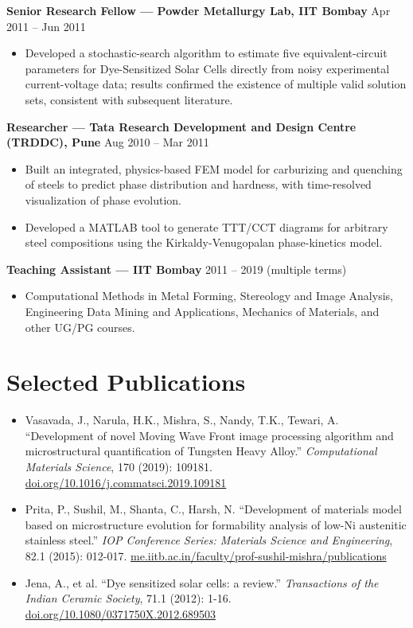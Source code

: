 \documentclass[10.5pt,a4paper]{article}
\newenvironment{tightitemize}
  {\begin{itemize}[leftmargin=1.2em,itemsep=1pt,topsep=2pt,parsep=0pt]}
  {\end{itemize}}
\newcommand{\entry}[3]{%
  \par\noindent\textbf{#1} \hfill #2\\
  {\itshape\small #3}\par\smallskip
}
\begin{document}
\entry{Senior Research Fellow --- Powder Metallurgy Lab, IIT Bombay}{Apr 2011 -- Jun 2011}{}
\begin{tightitemize}
\item Developed a stochastic-search algorithm to estimate five equivalent-circuit parameters for Dye-Sensitized Solar Cells directly from noisy experimental current-voltage data; results confirmed the existence of multiple valid solution sets, consistent with subsequent literature.
\end{tightitemize}

\entry{Researcher --- Tata Research Development and Design Centre (TRDDC), Pune}{Aug 2010 -- Mar 2011}{}
\begin{tightitemize}
\item Built an integrated, physics-based FEM model for carburizing and quenching of steels to predict phase distribution and hardness, with time-resolved visualization of phase evolution.
\item Developed a MATLAB tool to generate TTT/CCT diagrams for arbitrary steel compositions using the Kirkaldy-Venugopalan phase-kinetics model.
\end{tightitemize}

\entry{Teaching Assistant --- IIT Bombay}{2011 -- 2019 (multiple terms)}{}
\begin{tightitemize}
\item Computational Methods in Metal Forming, Stereology and Image Analysis, Engineering Data Mining and Applications, Mechanics of Materials, and other UG/PG courses.
\end{tightitemize}

\section{Selected Publications}
\begin{tightitemize}
\item Vasavada, J., Narula, H.K., Mishra, S., Nandy, T.K., Tewari, A. ``Development of novel Moving Wave Front image processing algorithm and microstructural quantification of Tungsten Heavy Alloy.'' \textit{Computational Materials Science}, 170 (2019): 109181. \href{https://doi.org/10.1016/j.commatsci.2019.109181}{doi.org/10.1016/j.commatsci.2019.109181}
\item Prita, P., Sushil, M., Shanta, C., Harsh, N. ``Development of materials model based on microstructure evolution for formability analysis of low-Ni austenitic stainless steel.'' \textit{IOP Conference Series: Materials Science and Engineering}, 82.1 (2015): 012-017. \href{https://www.me.iitb.ac.in/faculty/prof-sushil-mishra/publications}{me.iitb.ac.in/faculty/prof-sushil-mishra/publications}
\item Jena, A., et al. ``Dye sensitized solar cells: a review.'' \textit{Transactions of the Indian Ceramic Society}, 71.1 (2012): 1-16. \href{https://doi.org/10.1080/0371750X.2012.689503}{doi.org/10.1080/0371750X.2012.689503}
\end{tightitemize}
\end{document}
